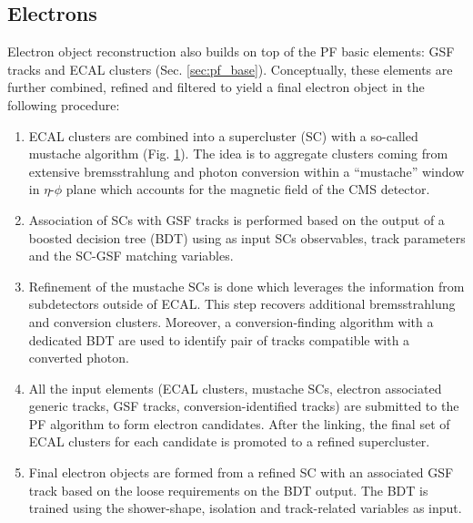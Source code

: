 \subsection{Electrons}\label{sec:reco_e}
Electron object reconstruction \cite{CMS:2020uim} also builds on top of the PF basic elements: GSF tracks and ECAL clusters (Sec. \ref{sec:pf_base}). Conceptually, these elements are further combined, refined and filtered to yield a final electron object in the following procedure: 
\begin{enumerate}

\begin{figure}[ht!]
    \centering
    \texttt{[image: Figures/CP\_etau/mustache.png]}
    \caption{Distribution of PF clusters around the seed cluster for simulated electrons with $1 < E_T^{\text{seed}} < 10~\text{GeV}$ and $1.48 < \eta^{\text{seed}} < 1.75$ \cite{CMS:2020uim}. The $z$ axis shows the number of PF clusters around the seed matched to simulation. The red line illustrates the region where the clusters are selected by the mustache algorithm.}
    \label{fig:mustache}
\end{figure}

    \item ECAL clusters are combined into a supercluster (SC) with a so-called mustache algorithm (Fig. \ref{fig:mustache}). The idea is to aggregate clusters coming from extensive bremsstrahlung and photon conversion within a \enquote{mustache} window in $\eta$-$\phi$ plane which accounts for the magnetic field of the CMS detector.

    \item Association of SCs with GSF tracks is performed based on the output of a boosted decision tree (BDT) using as input SCs observables, track parameters and the SC-GSF matching variables.
    \item Refinement of the mustache SCs is done which leverages the information from subdetectors outside of ECAL. This step recovers additional bremsstrahlung and conversion clusters. Moreover, a conversion-finding algorithm \cite{CMS:2015myp} with a dedicated BDT are used to identify pair of tracks compatible with a converted photon.
    
    \item All the input elements (ECAL clusters, mustache SCs, electron associated generic tracks, GSF tracks, conversion-identified tracks) are submitted to the PF algorithm to form electron candidates. After the linking, the final set of ECAL clusters for each candidate is promoted to a refined supercluster.
    
    \item Final electron objects are formed from a refined SC with an associated GSF track based on the loose requirements on the BDT output. The BDT is trained using the shower-shape, isolation and track-related variables as input.
\end{enumerate}

